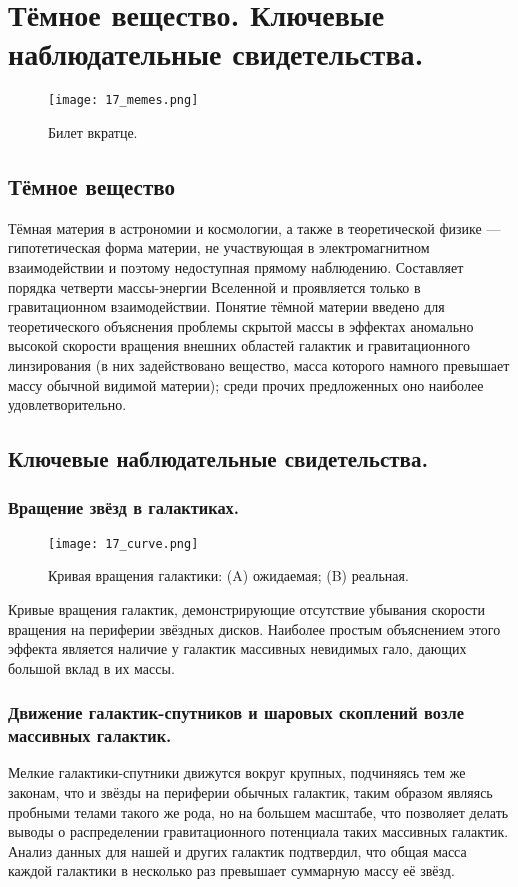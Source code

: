 \section{Тёмное вещество. Ключевые наблюдательные свидетельства.}
\begin{figure}[H]
    \centering
    \texttt{[image: 17\_memes.png]}
    \caption{Билет вкратце.}
    \label{fig:memes}
\end{figure}
\subsection{Тёмное вещество}
Тёмная материя в астрономии и космологии, а также в теоретической физике — гипотетическая форма материи, не участвующая в электромагнитном взаимодействии и поэтому недоступная прямому наблюдению. Составляет порядка четверти массы-энергии Вселенной и проявляется только в гравитационном взаимодействии. Понятие тёмной материи введено для теоретического объяснения проблемы скрытой массы в эффектах аномально высокой скорости вращения внешних областей галактик и гравитационного линзирования (в них задействовано вещество, масса которого намного превышает массу обычной видимой материи); среди прочих предложенных оно наиболее удовлетворительно.
\subsection{Ключевые наблюдательные свидетельства.}
\subsubsection{Вращение звёзд в галактиках.}
\begin{figure}[H]
    \centering
    \texttt{[image: 17\_curve.png]}
    \caption{Кривая вращения галактики: (A) ожидаемая; (B) реальная.}
    \label{fig:galaxy_curve}
\end{figure}
Кривые вращения галактик, демонстрирующие отсутствие убывания скорости вращения на периферии звёздных дисков. Наиболее простым объяснением этого эффекта является наличие у галактик массивных невидимых гало, дающих большой вклад в их массы.
\subsubsection{Движение галактик-спутников и шаровых скоплений возле массивных галактик.}
Мелкие галактики-спутники движутся вокруг крупных, подчиняясь тем же законам, что и звёзды на периферии обычных галактик, таким образом являясь пробными телами такого же рода, но на большем масштабе, что позволяет делать выводы о распределении гравитационного потенциала таких массивных галактик. Анализ данных для нашей и других галактик подтвердил, что общая масса каждой галактики в несколько раз превышает суммарную массу её звёзд.
